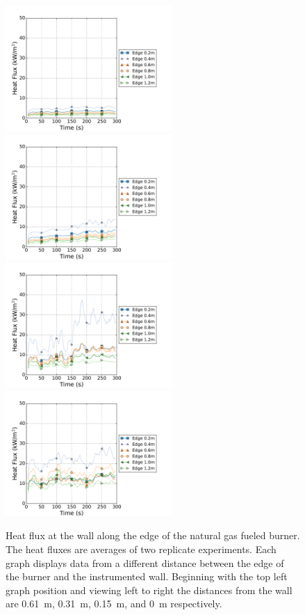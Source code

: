 \documentclass[twoside]{uocthesis}
\begin{document}
{\begin{figure}[ht!]
	\centering
	\includegraphics[width=2.5in]{../Figures/TWNG01_HF_Offset_Avg}
	\includegraphics[width=2.5in]{../Figures/TWNG03_HF_Offset_Avg}\\
	\includegraphics[width=2.5in]{../Figures/TWNG05_HF_Offset_Avg}
	\includegraphics[width=2.5in]{../Figures/TWNG07_HF_Offset_Avg}\\
	\caption[Heat flux at the wall along the edge of the natural gas fueled burner]{Heat flux at the wall along the edge of the natural gas fueled burner. The heat fluxes are averages of two replicate experiments. Each graph displays data from a different distance between the edge of the burner and the instrumented wall. Beginning with the top left graph position and viewing left to right the distances from the wall are 0.61~m, 0.31~m, 0.15~m, and 0~m respectively.}
	\label{HF_Edge_TWNG_comp}
\end{figure}

}
\end{document}
